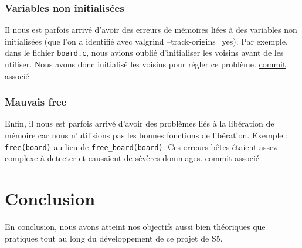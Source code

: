 \documentclass[a4paper,12pt]{report}
\begin{document}
\subsection*{Variables non initialisées}
Il nous est parfois arrivé d'avoir des erreurs de mémoires liées à des variables non initialisées (que l'on a identifié avec valgrind --track-origins=yes). Par exemple, dans le fichier \texttt{board.c}, nous avions oublié d'initialiser les voisins avant de les utiliser. Nous avons donc initialisé les voisins pour régler ce problème. \href{https://thor.enseirb-matmeca.fr/git/pr103-24344/commit/?id=29b963c47776a5f7875dd4a6949a67e9f0c58e5e}{commit associé}
\subsection*{Mauvais free}
Enfin, il nous est parfois arrivé d'avoir des problèmes liés à la libération de mémoire car nous n'utilisions pas les bonnes fonctions de libération. Exemple : \texttt{free(board)} au lieu de \texttt{free\_board(board)}. Ces erreurs bêtes étaient assez complexe à detecter et causaient de sévères dommages. \href{https://thor.enseirb-matmeca.fr/git/pr103-24344/commit/?id=b4902a65027cccd7db93f518f178839ca33083ed}{commit associé}
\chapter{Conclusion}
En conclusion, nous avons atteint nos objectifs aussi bien théoriques que pratiques tout au long du développement de ce projet de S5.
\end{document}
